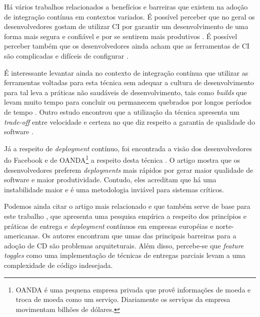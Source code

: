Há vários trabalhos relacionados a benefícios e barreiras que existem na adoção de integração contínua em contextos variados. É possível perceber que no geral os desenvolvedores gostam de utilizar CI por garantir um desenvolvimento de uma forma mais segura e confiável \cite{googleCi} e por se sentirem mais produtivos \cite{hilton2016}. É possível perceber também que os desenvolvedores ainda acham que as ferramentas de CI são complicadas e difíceis de configurar \cite{hilton2016}. 

É interessante levantar ainda no contexto de integração contínua que utilizar as ferramentas voltadas para esta técnica sem adequar a cultura de desenvolvimento para tal leva a práticas não saudáveis de desenvolvimento, tais como \emph{builds} que levam muito tempo para concluir ou permanecem quebrados por longos períodos de tempo  \cite{citheater2019}. Outro estudo encontrou que a utilização da técnica apresenta um \emph{trade-off} entre velocidade e certeza no que diz respeito a garantia de qualidade do software \cite{hilton2016}.

Já a respeito de \emph{deployment} contínuo, foi encontrada a visão dos desenvolvedores do Facebook e de OANDA\footnote{OANDA é uma pequena empresa privada que provê informações de moeda e troca de moeda como um serviço. Diariamente os serviços da empresa movimentam bilhões de dólares.} a respeito desta técnica \cite{savor2015}. O artigo mostra que os desenvolvedores preferem \emph{deployments} mais rápidos por gerar maior qualidade de software e maior produtividade. Contudo, eles acreditam que há uma instabilidade maior e é uma metodologia inviável para sistemas críticos.

Podemos ainda citar o artigo mais relacionado e que também serve de base para este trabalho \cite{empiricalStudy2016}, que apresenta uma pesquisa empírica a respeito dos princípios e práticas de entrega e \emph{deployment} contínuos em empresas européias e norte-americanas. Os autores encontram que umas das principais barreiras para a adoção de CD são problemas arquiteturais. Além disso, percebe-se que \emph{feature toggles} como uma implementação de técnicas de entregas parciais levam a uma complexidade de código indesejada.

